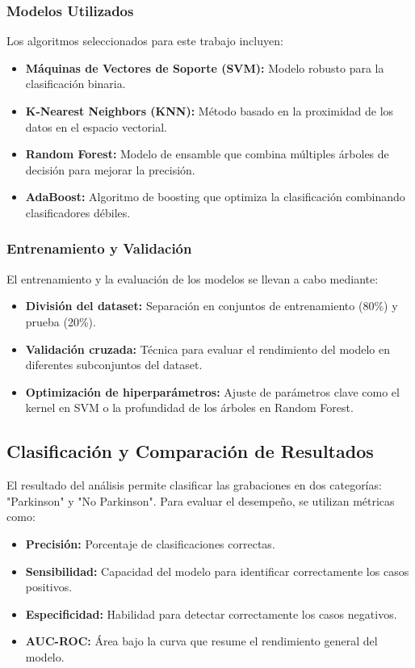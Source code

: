 \documentclass[listof=nochaptergap,12pt,times,authoryear]{report}
\begin{document}
\subsubsection{Modelos Utilizados}
Los algoritmos seleccionados para este trabajo incluyen:
\begin{itemize}
    \item \textbf{Máquinas de Vectores de Soporte (SVM):} Modelo robusto para la clasificación binaria.
    \item \textbf{K-Nearest Neighbors (KNN):} Método basado en la proximidad de los datos en el espacio vectorial.
    \item \textbf{Random Forest:} Modelo de ensamble que combina múltiples árboles de decisión para mejorar la precisión.
    \item \textbf{AdaBoost:} Algoritmo de boosting que optimiza la clasificación combinando clasificadores débiles.
\end{itemize}

\subsubsection{Entrenamiento y Validación}
El entrenamiento y la evaluación de los modelos se llevan a cabo mediante:
\begin{itemize}
    \item \textbf{División del dataset:} Separación en conjuntos de entrenamiento (80\%) y prueba (20\%).
    \item \textbf{Validación cruzada:} Técnica para evaluar el rendimiento del modelo en diferentes subconjuntos del dataset.
    \item \textbf{Optimización de hiperparámetros:} Ajuste de parámetros clave como el kernel en SVM o la profundidad de los árboles en Random Forest.
\end{itemize}

\subsection{Clasificación y Comparación de Resultados}
El resultado del análisis permite clasificar las grabaciones en dos categorías: "Parkinson" y "No Parkinson". Para evaluar el desempeño, se utilizan métricas como:
\begin{itemize}
    \item \textbf{Precisión:} Porcentaje de clasificaciones correctas.
    \item \textbf{Sensibilidad:} Capacidad del modelo para identificar correctamente los casos positivos.
    \item \textbf{Especificidad:} Habilidad para detectar correctamente los casos negativos.
    \item \textbf{AUC-ROC:} Área bajo la curva que resume el rendimiento general del modelo.
\end{itemize}
\end{document}
